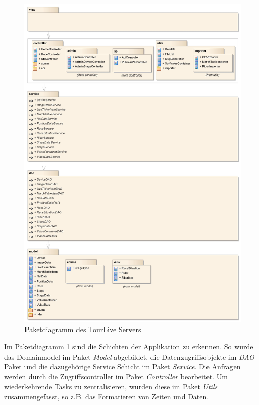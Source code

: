 \begin{figure}[H]
	\centering
	\includegraphics[width=130mm]{images/tourliveweb/TourLiveServer_Package_ohneRand.jpg}
	\caption{Paketdiagramm des TourLive Servers}
	\label{fig:tourlivewebpackage}
\end{figure}

Im Paketdiagramm \ref{fig:tourlivewebpackage} sind die Schichten der Applikation zu erkennen. So wurde das Domainmodel im Paket \textit{Model} abgebildet, die Datenzugriffsobjekte im \textit{DAO} Paket und die dazugehörige Service Schicht im Paket \textit{Service}. Die Anfragen werden durch die Zugriffscontroller im Paket \textit{Controller} bearbeitet. Um wiederkehrende Tasks zu zentralisieren, wurden diese im Paket \textit{Utils} zusammengefasst, so z.B. das Formatieren von Zeiten und Daten.

